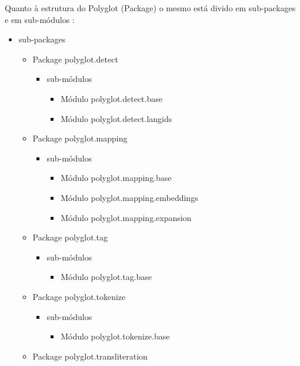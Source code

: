\documentclass{article}
\begin{document}
Quanto à estrutura do Polyglot (Package) o mesmo está divido em sub-packages e em sub-módulos \cite{modulos}:
\begin{itemize}
    \item sub-packages
    \begin{itemize}
        \item Package polyglot.detect
        \begin{itemize}
            \item sub-módulos
            \begin{itemize}
                \item Módulo polyglot.detect.base
                \item Módulo polyglot.detect.langids
            \end{itemize}
        \end{itemize}
        \item Package polyglot.mapping
        \begin{itemize}
            \item sub-módulos
            \begin{itemize}
                \item Módulo polyglot.mapping.base
                \item Módulo polyglot.mapping.embeddings
                \item Módulo polyglot.mapping.expansion
            \end{itemize}
        \end{itemize}
        \item Package polyglot.tag
        \begin{itemize}
            \item sub-módulos
            \begin{itemize}
                \item Módulo polyglot.tag.base
            \end{itemize}
        \end{itemize}
        \item Package polyglot.tokenize
        \begin{itemize}
            \item sub-módulos
            \begin{itemize}
                \item Módulo polyglot.tokenize.base
            \end{itemize}
        \end{itemize}
        \item Package polyglot.transliteration

\end{itemize}
\end{itemize}
\end{document}
